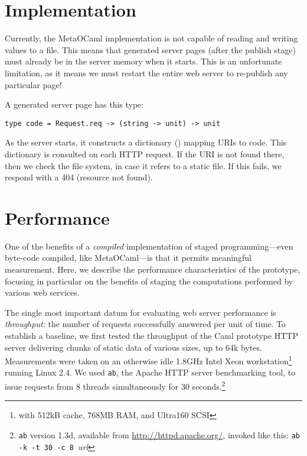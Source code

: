 \documentclass[preprint]{acm_proc_article-sp}
\def\MOC{MetaOCaml}
\begin{document}
\section{Implementation}
\label{sec:impl}


Currently, the \MOC{} implementation is not capable of reading
and writing  values to a file.  This means that
generated server pages (after the publish stage) must already be
in the server memory when it starts.  This is an unfortunate
limitation, as it means we must restart the entire web server to
re-publish any particular page!

A generated server page has this type:
\begin{lstlisting}[numbers=none]
  type code = Request.req -> (string -> unit) -> unit
\end{lstlisting}
As the server starts, it constructs a dictionary () mapping URIs to code.  This dictionary is
consulted on each HTTP request.  If the URI is not found there,
then we check the file system, in case it refers to a static
file.  If this fails, we respond with a 404 (resource not
found).


\section{Performance}
\label{sec:perf}

One of the benefits of a \emph{compiled} implementation of staged
programming---even byte-code compiled, like \MOC{}---is that it
permits meaningful measurement.  Here, we describe the performance
characteristics of the prototype, focusing in particular on the
benefits of staging the computations performed by various web
services.

The single most important datum for evaluating web server performance
is \textit{throughput:} the number of requests successfully answered
per unit of time.  To establish a baseline, we first tested the
throughput of the Caml prototype HTTP server delivering chunks of
static data of various sizes, up to 64k bytes.
Measurements were taken on an otherwise idle 1.8GHz Intel
Xeon\texttrademark{} workstation\footnote{with 512kB cache, 768MB RAM,
  and Ultra160 SCSI} running Linux 2.4.  We used \texttt{ab},
the Apache HTTP server benchmarking tool, to issue requests
from 8 threads simultaneously for 30 seconds.\footnote{\texttt{ab}
  version 1.3d, available from \url{http://httpd.apache.org/}, 
  invoked like this:
  \texttt{ab -k -t 30 -c 8 }\textit{url}}
\end{document}
